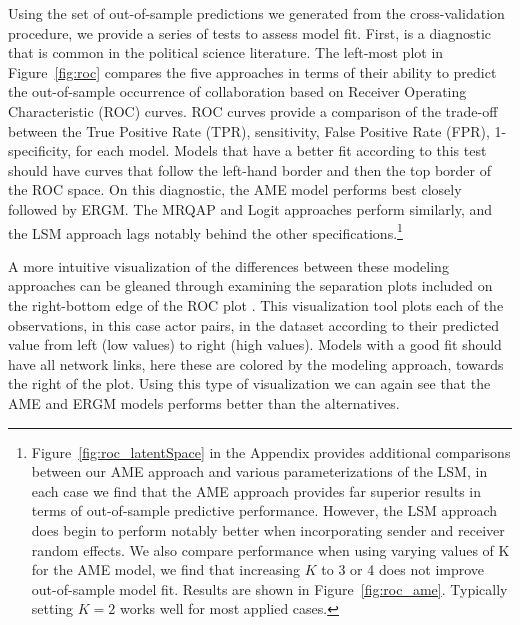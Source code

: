 \documentclass[12pt,pdflatex]{elsarticle}
\begin{document}
Using the set of out-of-sample predictions we generated from the cross-validation procedure, we provide a series of tests to assess model fit. First, is a diagnostic that is common in the political science literature. The left-most plot in Figure~\ref{fig:roc} compares the five approaches in terms of their ability to predict the out-of-sample occurrence of collaboration based on Receiver Operating Characteristic (ROC) curves. ROC curves provide a comparison of the trade-off between the True Positive Rate (TPR), sensitivity, False Positive Rate (FPR), 1-specificity, for each model. Models that have a better fit according to this test should have curves that follow the left-hand border and then the top border of the ROC space. On this diagnostic, the AME model performs best closely followed by ERGM. The MRQAP and Logit approaches perform similarly, and the LSM approach lags notably behind the other specifications.\footnote{Figure~\ref{fig:roc_latentSpace} in the Appendix provides additional comparisons between our AME approach and various parameterizations of the LSM, in each case we find that the AME approach provides far superior results in terms of out-of-sample predictive performance. However, the LSM approach does begin to perform notably better when incorporating sender and receiver random effects. We also compare performance when using varying values of K for the AME model, we find that increasing $K$ to 3 or 4 does not improve out-of-sample model fit. Results are shown in Figure~\ref{fig:roc_ame}. Typically setting $K=2$ works well for most applied cases.} 

A more intuitive visualization of the differences between these modeling approaches can be gleaned through examining the separation plots included on the right-bottom edge of the ROC plot \citep{greenhill:etal:2011}. This visualization tool plots each of the observations, in this case actor pairs, in the dataset according to their predicted value from left (low values) to right (high values). Models with a good fit should have all network links, here these are colored by the modeling approach, towards the right of the plot. Using this type of visualization we can again see that the AME and ERGM models performs better than the alternatives.
\end{document}
